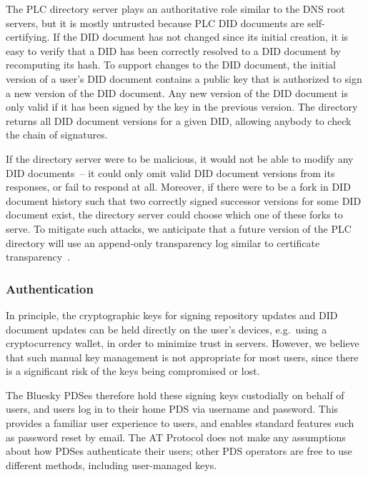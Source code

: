 \documentclass[sigconf]{acmart}
\begin{document}
The PLC directory server plays an authoritative role similar to the DNS root servers, but it is mostly untrusted because PLC DID documents are self-certifying.
If the DID document has not changed since its initial creation, it is easy to verify that a DID has been correctly resolved to a DID document by recomputing its hash.
To support changes to the DID document, the initial version of a user's DID document contains a public key that is authorized to sign a new version of the DID document.
Any new version of the DID document is only valid if it has been signed by the key in the previous version.
The directory returns all DID document versions for a given DID, allowing anybody to check the chain of signatures.

If the directory server were to be malicious, it would not be able to modify any DID documents~-- it could only omit valid DID document versions from its responses, or fail to respond at all.
Moreover, if there were to be a fork in DID document history such that two correctly signed successor versions for some DID document exist, the directory server could choose which one of these forks to serve.
To mitigate such attacks, we anticipate that a future version of the PLC directory will use an append-only transparency log similar to certificate transparency~\cite{Laurie:2014}.

\subsubsection{Authentication}

In principle, the cryptographic keys for signing repository updates and DID document updates can be held directly on the user's devices, e.g.\ using a cryptocurrency wallet, in order to minimize trust in servers.
However, we believe that such manual key management is not appropriate for most users, since there is a significant risk of the keys being compromised or lost.

The Bluesky PDSes therefore hold these signing keys custodially on behalf of users, and users log in to their home PDS via username and password.
This provides a familiar user experience to users, and enables standard features such as password reset by email.
The AT Protocol does not make any assumptions about how PDSes authenticate their users; other PDS operators are free to use different methods, including user-managed keys.

\end{document}
